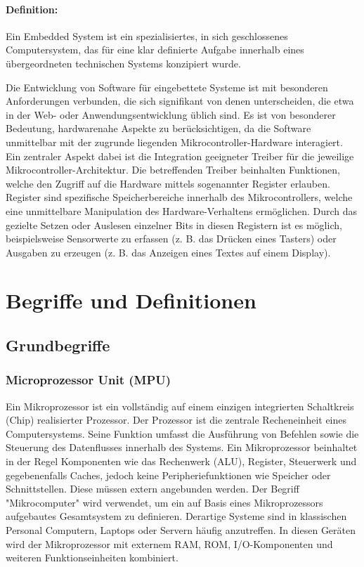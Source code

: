 \paragraph{Definition:}
Ein Embedded System ist ein spezialisiertes, in sich geschlossenes Computersystem, das für eine klar definierte Aufgabe innerhalb eines übergeordneten technischen Systems konzipiert wurde.

\vspace{6 mm}

Die Entwicklung von Software für eingebettete Systeme ist mit besonderen Anforderungen verbunden, die sich signifikant von denen unterscheiden, die etwa in der Web- oder Anwendungsentwicklung üblich sind.
Es ist von besonderer Bedeutung, hardwarenahe Aspekte zu berücksichtigen, da die Software unmittelbar mit der zugrunde liegenden Mikrocontroller-Hardware interagiert.
Ein zentraler Aspekt dabei ist die Integration geeigneter Treiber für die jeweilige Mikrocontroller-Architektur.
Die betreffenden Treiber beinhalten Funktionen, welche den Zugriff auf die Hardware mittels sogenannter Register erlauben.
Register sind spezifische Speicherbereiche innerhalb des Mikrocontrollers, welche eine unmittelbare Manipulation des Hardware-Verhaltens ermöglichen.
Durch das gezielte Setzen oder Auslesen einzelner Bits in diesen Registern ist es möglich, beispielsweise Sensorwerte zu erfassen (z. B. das Drücken eines Tasters) oder Ausgaben zu erzeugen (z. B. das Anzeigen eines Textes auf einem Display).



\section{Begriffe und Definitionen}

\subsection{Grundbegriffe}
\subsubsection*{Microprozessor Unit (MPU)}
Ein Mikroprozessor ist ein vollständig auf einem einzigen integrierten Schaltkreis (Chip) realisierter Prozessor.
Der Prozessor ist die zentrale Recheneinheit eines Computersystems.
Seine Funktion umfasst die Ausführung von Befehlen sowie die Steuerung des Datenflusses innerhalb des Systems. 
Ein Mikroprozessor beinhaltet in der Regel Komponenten wie das Rechenwerk (ALU), Register, Steuerwerk und gegebenenfalls Caches, jedoch keine Peripheriefunktionen wie Speicher oder Schnittstellen. 
Diese müssen extern angebunden werden.
Der Begriff "Mikrocomputer" wird verwendet, um ein auf Basis eines Mikroprozessors aufgebautes Gesamtsystem zu definieren. 
Derartige Systeme sind in klassischen Personal Computern, Laptops oder Servern häufig anzutreffen.
In diesen Geräten wird der Mikroprozessor mit externem RAM, ROM, I/O-Komponenten und weiteren Funktionseinheiten kombiniert.

